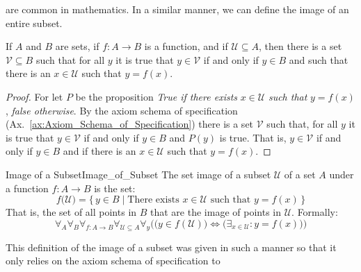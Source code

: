         are common in mathematics. In a similar manner, we can define the image
        of an entire subset.
        \begin{theorem}
            If $A$ and $B$ are sets, if $f:A\rightarrow{B}$ is a function,
            and if $\mathcal{U}\subseteq{A}$, then there is a set
            $\mathcal{V}\subseteq{B}$ such that for all $y$ it is true that
            $y\in\mathcal{V}$ if and only if $y\in{B}$ and such that there is
            an $x\in\mathcal{U}$ such that $y=f(x)$.
        \end{theorem}
        \begin{proof}
            For let $P$ be the proposition \textit{True if there exists}
            $x\in\mathcal{U}$ \textit{such that} $y=f(x)$,
            \textit{false otherwise}. By the axiom schema of specification
            (Ax.~\ref{ax:Axiom_Schema_of_Specification}) there is a set
            $\mathcal{V}$ such that, for all $y$ it is true that
            $y\in\mathcal{V}$ if and only if $y\in{B}$ and $P(y)$ is true. That
            is, $y\in\mathcal{V}$ if and only if $y\in{B}$ and if there is an
            $x\in\mathcal{U}$ such that $y=f(x)$.
        \end{proof}
        \begin{fdefinition}{Image of a Subset}{Image_of_Subset}
            The \gls{set image} of a \gls{subset} $\mathcal{U}$ of a \gls{set}
            $A$ under a \gls{function} $f:A\rightarrow{B}$ is the
            set:
            \begin{equation*}
                f\big(\mathcal{U}\big)=
                    \{\,y\in{B}\;|\;\textrm{There exists }x\in\mathcal{U}
                                    \textrm{ such that }y=f(x)\,\}
            \end{equation*}
            That is, the set of all points in $B$ that are the image of points
            in $\mathcal{U}$. Formally:
            \begin{equation*}
                \forall_{A}\forall_{B}\forall_{f:A\rightarrow{B}}
                \forall_{\mathcal{U}\subseteq{A}}\forall_{y}\Big(
                    \big(y\in{f}(\mathcal{U})\big)\Longleftrightarrow
                    \big(\exists_{x\in\mathcal{U}}:y=f(x)\big)\Big)
            \end{equation*}
        \end{fdefinition}
        This definition of the image of a subset was given in such a manner
        so that it only relies on the axiom schema of specification to
